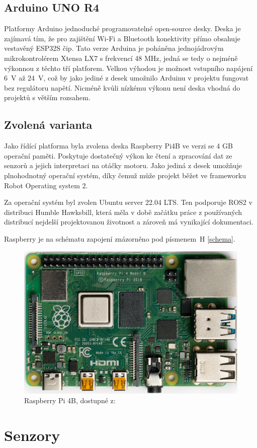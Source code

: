 \subsection*{Arduino UNO R4}
Platformy Arduino jednoduché programovatelné open-source desky. Deska je zajímavá tím, že pro zajištění Wi-Fi a Bluetooth konektivity přímo obsahuje vestavěný ESP32S čip. Tato verze Arduina je poháněna jednojádrovým mikrokontrolérem Xtensa LX7 s frekvencí 48 MHz, jedná se tedy o nejméně výkonnou z těchto tří platforem. Velkou výhodou je možnost vstupního napájení 6~V až 24~V, což by jako jediné z desek umožnilo Arduinu v projektu fungovat bez regulátoru napětí. Nicméně kvůli nízkému výkonu není deska vhodná do projektů s větším rozsahem. \cite{arduino}

\subsection*{Zvolená varianta}
Jako řídící platforma byla zvolena deska Raspberry Pi4B ve verzi se 4 GB operační paměti. Poskytuje dostatečný výkon ke čtení a zpracování dat ze senzorů a jejich interpretaci na otáčky motoru. Jako jediná z desek umožňuje plnohodnotný operační systém, díky čemuž může projekt běžet ve frameworku Robot Operating system 2. 

Za operační systém byl zvolen Ubuntu server 22.04 LTS. Ten podporuje ROS2 v distribuci Humble Hawksbill, která měla v době začátku práce z používaných distribucí nejdelší projektovanou životnost a zároveň má vynikající dokumentaci.

Raspberry je na schématu zapojení znázorněno pod písmenem~H \ref{schema}.

\begin{figure}[H]
    \centering
    \includegraphics[width=0.5\linewidth]{obrazky-figures/raspberry.jpg}
    \caption{Raspberry Pi 4B, dostupné z: \cite{raspberry_img}}
    \label{raspberry}
\end{figure}

\section{Senzory}
